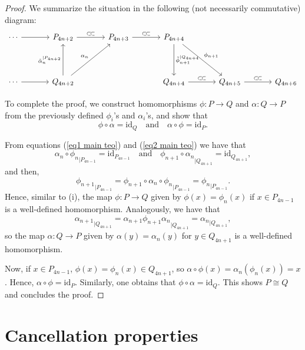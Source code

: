 \documentclass[11pt]{amsart}
\numberwithin{equation}{section}
\theoremstyle{definition}
\newcommand{\cc}{\subset\!\subset}
\newcommand{\tiphi}{\tilde{\phi}}
\newcommand{\tialpha}{\tilde{\alpha}}
\theoremstyle{plain}
\theoremstyle{definition}
\begin{document}
\begin{proof}
We summarize the situation in the following (not necessarily commutative) diagram:
\[
\begin{tikzcd}[column sep=3.5em, row sep=4em]
\cdots \arrow[r, ""] &  P_{4n+2} \arrow[r, "\cc"] & P_{4n+3} \arrow[r, "\cc"] & P_{4n + 4} \arrow[d, "\tiphi_{n+1}^{|Q_{4n + 4}}"] \arrow[dr, "\phi_{n+1}"] & & \\
\cdots \arrow[r, ""] & Q_{4n+2} \arrow[u, "\tialpha_{n}^{|P_{4n + 2}}"] \arrow[ur, "\alpha_{n}"] &  & Q_{4n + 4} \arrow[r, "\cc"] & Q_{4n + 5} \arrow[r, "\cc"] & Q_{4n + 6}
\end{tikzcd}
\] 

To complete the proof, we construct homomorphisms $\phi \colon P \to Q$ and $\alpha \colon Q \to P$ from the previously defined 
$\phi_i$'s and $\alpha_i$'s, and show that
\begin{equation*}
 \phi \circ \alpha = \mathrm{id}_Q \quad \text{and} \quad
\alpha \circ \phi = \mathrm{id}_P.
\end{equation*}

From equations (\ref{eq1 main teo}) and (\ref{eq2 main teo}) we have that 
\begin{equation*}
{\alpha_n \circ \phi_n}_{|P_{4n - 1}} = \mathrm{id}_{P_{4n - 1}} \quad \text{and} \quad {\phi_{n+1} \circ \alpha_n}_{|Q_{4n + 1}} = \mathrm{id}_{Q_{4n + 1}}, 
\end{equation*}
and then, 
\begin{equation*}
    {\phi_{n+1}}_{|P_{4n - 1}} = {\phi_{n+1}\circ\alpha_n\circ\phi_n}_{|P_{4n - 1}} = {\phi_n}_{|P_{4n - 1}}.
\end{equation*}
Hence, similar to (i), the map $\phi \colon P \rightarrow Q$ given by $\phi(x) = \phi_{n}(x)$ if $x \in P_{4n - 1}$ is a well-defined homomorphism. Analogously, we have that
\begin{equation*}
    {\alpha_{n+1}}_{|Q_{4n + 1}} = {\alpha_{n+1}\phi_{n+1}\alpha_n}_{|Q_{4n + 1}} = {\alpha_{n}}_{|Q_{4n + 1}},
\end{equation*}
so the map $\alpha \colon Q \rightarrow P$ given by $\alpha(y) = \alpha_{n}(y)$ for $y \in Q_{4n+1}$ is a well-defined homomorphism. 

Now, if $x \in P_{4n -1}$, $\phi(x) = \phi_{n}(x) \in Q_{4n + 1}$, so $\alpha\circ\phi(x) = \alpha_n(\phi_n(x)) = x$. Hence, $\alpha \circ \phi = \mathrm{id}_{P}$. Similarly, one obtains that  $\phi \circ \alpha = \mathrm{id}_Q$. This shows $P \cong Q$ and concludes the proof. 
\end{proof}


\section{Cancellation properties}
\end{document}

